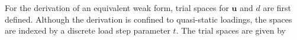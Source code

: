 
For the derivation of an equivalent weak form, trial spaces for $\textbf{u}$ and $d$ are first defined.  Although the derivation is confined to quasi-static loadings, the spaces are indexed by a discrete load step parameter $t$.   The trial spaces are given by

